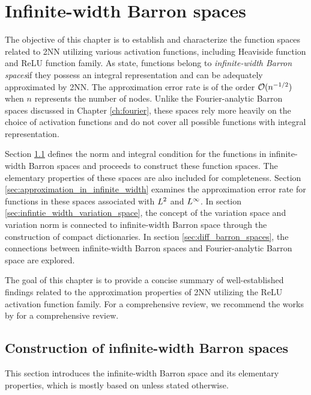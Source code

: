 \chapter{Infinite-width Barron spaces}
\label{ch:infinite}

The objective of this chapter is to establish and characterize the function
spaces related to 2NN utilizing various activation functions, including
Heaviside function and ReLU function family. As
\cite{carageaNeuralNetworkApproximation2022} state, functions belong to
\textit{infinite-width Barron spaces}if they possess an integral representation
and can be adequately approximated by 2NN. The approximation error rate is of
the order $\mathcal{O}(n^{-1/2})$ when $n$ represents the number of nodes. Unlike the
Fourier-analytic Barron spaces discussed in Chapter \ref{ch:fourier}, these
spaces rely more heavily on the choice of activation functions and do not cover
all possible functions with integral representation.

Section \ref{sec:construction_of_infinite_width} defines the norm and integral
condition for the functions in infinite-width Barron spaces and proceeds to
construct these function spaces. The elementary properties of these spaces are
also included for completeness. Section
\ref{sec:approximation_in_infinite_width} examines the approximation error rate
for functions in these spaces associated with $L^{2}$ and $L^{\infty}$. In
section \ref{sec:infintie_width_variation_space}, the concept of the variation
space and variation norm is connected to infinite-width Barron space through the
construction of compact dictionaries. In section \ref{sec:diff_barron_spaces},
the connections between infinite-width Barron spaces and Fourier-analytic Barron
space are explored.

The goal of this chapter is to provide a concise summary of well-established
findings related to the approximation properties of 2NN utilizing the ReLU
activation function family. For a comprehensive review, we recommend the works
by \cite{eMathematicalUnderstandingNeural2020,bernerModernMathematicsDeep2021}
for a comprehensive review.


\section{Construction of infinite-width Barron spaces}
\label{sec:construction_of_infinite_width}

This section introduces the infinite-width Barron space and its elementary
properties, which is mostly based on \cite{eBarronSpaceFlowinduced2021} unless
stated otherwise.

